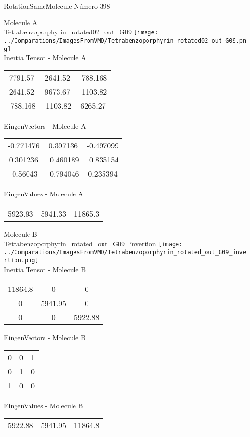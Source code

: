 \vtab[-2cm]
\begin{center}
{\large RotationSameMolecule \tab Número 398}
\end{center}
\begin{multicols}{2}
\begin{center}

Molecule A \\ 
Tetrabenzoporphyrin\_rotated02\_out\_G09
\texttt{[image: ../Comparations/ImagesFromVMD/Tetrabenzoporphyrin\_rotated02\_out\_G09.png]}
\\
Inertia Tensor - Molecule A \\
\vtab

\begin{tabular}{|c c c|}
7791.57	 & 	2641.52	 & 	-788.168	 \\
2641.52	 & 	9673.67	 & 	-1103.82	 \\
-788.168	 & 	-1103.82	 & 	6265.27
\end{tabular}

\vtab
 EingenVectors - Molecule A     \\
\vtab
\begin{tabular}{|c c c|}
-0.771476	 & 	0.397136	 & 	-0.497099	 \\
0.301236	 & 	-0.460189	 & 	-0.835154	 \\
-0.56043	 & 	-0.794046	 & 	0.235394
\end{tabular}

\vtab
 EingenValues - Molecule A     \\
\vtab
\begin{tabular}{|c c c|}
5923.93	 & 	5941.33	 & 	11865.3	 \\
\end{tabular}
\columnbreak

Molecule B \\ 
Tetrabenzoporphyrin\_rotated\_out\_G09\_invertion
\texttt{[image: ../Comparations/ImagesFromVMD/Tetrabenzoporphyrin\_rotated\_out\_G09\_invertion.png]}
\\
Inertia Tensor - Molecule B \\
\vtab

\begin{tabular}{|c c c|}
11864.8	 & 	0	 & 	0	 \\
0	 & 	5941.95	 & 	0	 \\
0	 & 	0	 & 	5922.88
\end{tabular}

\vtab
 EingenVectors - Molecule B     \\
\vtab
\begin{tabular}{|c c c|}
0	 & 	0	 & 	1	 \\
0	 & 	1	 & 	0	 \\
1	 & 	0	 & 	0
\end{tabular}

\vtab
 EingenValues - Molecule B     \\
\vtab
\begin{tabular}{|c c c|}
5922.88	 & 	5941.95	 & 	11864.8	 \\
\end{tabular}

\end{center}
\end{multicols}
